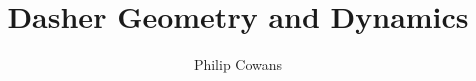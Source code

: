 \documentclass{article}
\begin{document}
\title{Dasher Geometry and Dynamics}
\author{Philip Cowans}

\maketitle
\end{document}
